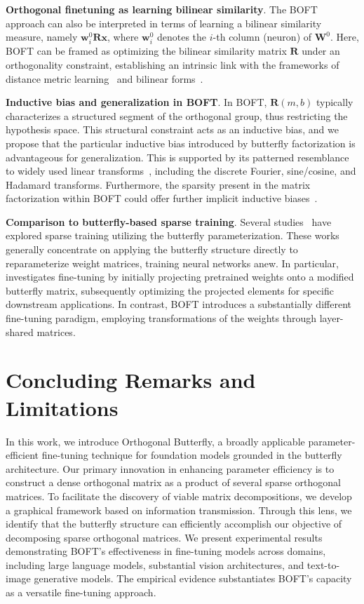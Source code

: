 \textbf{Orthogonal finetuning as learning bilinear similarity}. The BOFT approach can also be interpreted in terms of learning a bilinear similarity measure, namely $\bm{w}^0_i\bm{R}\bm{x}$, where $\bm{w}^0_i$ denotes the $i$-th column (neuron) of $\bm{W}^0$. Here, BOFT can be framed as optimizing the bilinear similarity matrix $\bm{R}$ under an orthogonality constraint, establishing an intrinsic link with the frameworks of distance metric learning~\cite{xing2002distance} and bilinear forms~\cite{roman2005advanced}.

\textbf{Inductive bias and generalization in BOFT}. In BOFT, $\bm{R}(m,b)$ typically characterizes a structured segment of the orthogonal group, thus restricting the hypothesis space. This structural constraint acts as an inductive bias, and we propose that the particular inductive bias introduced by butterfly factorization is advantageous for generalization. This is supported by its patterned resemblance to widely used linear transforms~\cite{dao2019kaleidoscope}, including the discrete Fourier, sine/cosine, and Hadamard transforms. Furthermore, the sparsity present in the matrix factorization within BOFT could offer further implicit inductive biases~\cite{gunasekar2017implicit,li2018algorithmic,liu2019neural}.

\textbf{Comparison to butterfly-based sparse training}. Several studies~\cite{dao2019learning,dao2019kaleidoscope,chen2022pixelated,dao2022monarch} have explored sparse training utilizing the butterfly parameterization. These works generally concentrate on applying the butterfly structure directly to reparameterize weight matrices, training neural networks anew. In particular, \cite{dao2022monarch} investigates fine-tuning by initially projecting pretrained weights onto a modified butterfly matrix, subsequently optimizing the projected elements for specific downstream applications. In contrast, BOFT introduces a substantially different fine-tuning paradigm, employing transformations of the weights through layer-shared matrices.



\section{Concluding Remarks and Limitations}

In this work, we introduce Orthogonal Butterfly, a broadly applicable parameter-efficient fine-tuning technique for foundation models grounded in the butterfly architecture. Our primary innovation in enhancing parameter efficiency is to construct a dense orthogonal matrix as a product of several sparse orthogonal matrices. To facilitate the discovery of viable matrix decompositions, we develop a graphical framework based on information transmission. Through this lens, we identify that the butterfly structure can efficiently accomplish our objective of decomposing sparse orthogonal matrices. We present experimental results demonstrating BOFT’s effectiveness in fine-tuning models across domains, including large language models, substantial vision architectures, and text-to-image generative models. The empirical evidence substantiates BOFT’s capacity as a versatile fine-tuning approach.

